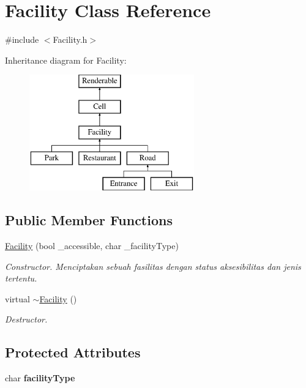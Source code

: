 \hypertarget{classFacility}{\section{Facility Class Reference}
\label{classFacility}
}


{\ttfamily \#include $<$Facility.\+h$>$}

Inheritance diagram for Facility\+:\begin{figure}[H]
\begin{center}
\leavevmode
\includegraphics[height=5.000000cm]{classFacility}
\end{center}
\end{figure}
\subsection*{Public Member Functions}
\begin{DoxyCompactItemize}
\item 
\hyperlink{classFacility_a9b41510329095aeb06232f06af2d4152}{Facility} (bool \+\_\+accessible, char \+\_\+facility\+Type)
\begin{DoxyCompactList}\small\item\em Constructor. Menciptakan sebuah fasilitas dengan status aksesibilitas dan jenis tertentu. \end{DoxyCompactList}\item 
\hypertarget{classFacility_a0d756a7273f5cb2fc57575459ba45670}{virtual \hyperlink{classFacility_a0d756a7273f5cb2fc57575459ba45670}{$\sim$\+Facility} ()}\label{classFacility_a0d756a7273f5cb2fc57575459ba45670}

\begin{DoxyCompactList}\small\item\em Destructor. \end{DoxyCompactList}\end{DoxyCompactItemize}
\subsection*{Protected Attributes}
\begin{DoxyCompactItemize}
\item 
\hypertarget{classFacility_a55542247d165c099f791dc41c1eda23e}{char {\bfseries facility\+Type}}\label{classFacility_a55542247d165c099f791dc41c1eda23e}

\end{DoxyCompactItemize}


